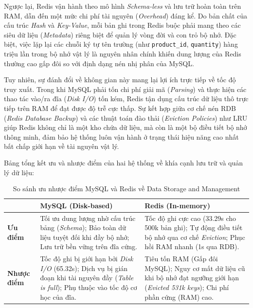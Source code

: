 Ngược lại, Redis vận hành theo mô hình \textit{Schema-less} và lưu trữ hoàn toàn trên RAM, dẫn đến một mức chi phí tài nguyên (\textit{Overhead}) đáng kể. Do bản chất của cấu trúc \textit{Hash} và \textit{Key-Value}, mỗi bản ghi trong Redis buộc phải mang theo các siêu dữ liệu (\textit{Metadata}) riêng biệt để quản lý vòng đời và con trỏ bộ nhớ. Đặc biệt, việc lặp lại các chuỗi ký tự tên trường (như \texttt{product\_id}, \texttt{quantity}) hàng triệu lần trong bộ nhớ vật lý là nguyên nhân chính khiến dung lượng của Redis thường cao gấp đôi so với định dạng nén nhị phân của MySQL.

Tuy nhiên, sự đánh đổi về không gian này mang lại lợi ích trực tiếp về tốc độ truy xuất. Trong khi MySQL phải tốn chi phí giải mã (\textit{Parsing}) và thực hiện các thao tác vào/ra đĩa (\textit{Disk I/O}) tốn kém, Redis tận dụng cấu trúc dữ liệu thô trực tiếp trên RAM để đạt được độ trễ cực thấp. Sự kết hợp giữa cơ chế nén RDB (\textit{Redis Database Backup}) và các thuật toán đào thải (\textit{Eviction Policies}) như LRU giúp Redis không chỉ là một kho chứa dữ liệu, mà còn là một bộ điều tiết bộ nhớ thông minh, đảm bảo hệ thống luôn vận hành ở trạng thái hiệu năng cao nhất bất chấp giới hạn về tài nguyên vật lý.

Bảng tổng kết ưu và nhược điểm của hai hệ thống về khía cạnh lưu trữ và quản lý dữ liệu:
\begin{table}[H]
\centering
\caption{So sánh ưu nhược điểm MySQL và Redis về Data Storage and Management}

\begin{tabular}{|l|p{5cm}|p{5cm}|}
\hline
 & \textbf{MySQL (Disk-based)} & \textbf{Redis (In-memory)} \\ \hline
\textbf{Ưu điểm} & Tối ưu dung lượng nhờ cấu trúc bảng (\textit{Schema}); Bảo toàn dữ liệu tuyệt đối khi đầy bộ nhớ; Lưu trữ bền vững trên đĩa cứng. & Tốc độ ghi cực cao (33.29s cho 500k bản ghi); Tự động điều tiết bộ nhớ qua cơ chế \textit{Eviction}; Phục hồi RAM nhanh (1s qua RDB). \\ \hline
\textbf{Nhược điểm} & Tốc độ ghi bị giới hạn bởi \textit{Disk I/O} (65.32s); Dịch vụ bị gián đoạn khi tài nguyên đầy (\textit{Table is full}); Phụ thuộc vào tốc độ cơ học của đĩa. & Tiêu tốn RAM (Gấp đôi MySQL); Nguy cơ mất dữ liệu cũ khi bộ nhớ đạt ngưỡng giới hạn (\textit{Evicted 531k keys}); Chi phí phần cứng (RAM) cao. \\ \hline
\end{tabular}
\end{table}